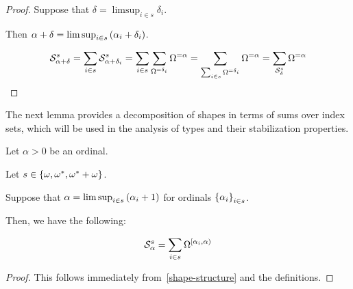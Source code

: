 \begin{proof}
  Suppose that $\delta = \limsup_{i \in s} \delta_i$.

  Then $\alpha + \delta = \limsup_{i \in s} \left( {\alpha_i + \delta_i} \right)$.

  \[
    \mathcal{S}^{s}_{\alpha + \delta}
    = \sum_{i \in s}{\mathcal{S}^{s}_{\alpha + \delta_i}}
    = \sum_{i \in s}\sum_{\Omega^{= \delta_i}}{\Omega^{= \alpha}}
    = \sum_{\sum_{i \in s}{\Omega^{= \delta_i}}}{\Omega^{= \alpha}}
    = \sum_{\mathcal{S}^{s}_{\delta}}{\Omega^{= \alpha}}
  \]
\end{proof}

The next lemma provides a decomposition of shapes in terms of sums over index sets, which will be used in the analysis of
types and their stabilization properties.

\begin{lemma}\label{decomposition-lemma}
  Let $\alpha > 0$ be an ordinal.

  Let $s \in \left\{ {\omega, \omega^\ast, \omega^\ast + \omega} \right\}$.

  Suppose that
  $\alpha = \limsup_{i \in s} \left( {\alpha_i + 1} \right)$ for
  ordinals $\left\{ {\alpha_i} \right\}_{i \in s}$.

  Then, we have the following:

  \[
    \mathcal{S}^{s}_{\alpha} = \sum_{i \in s}{\Omega^{[\alpha_i, \alpha)}}
  \]
\end{lemma}

\begin{proof}
  This follows immediately from~\cref{shape-structure} and the definitions.
\end{proof}
